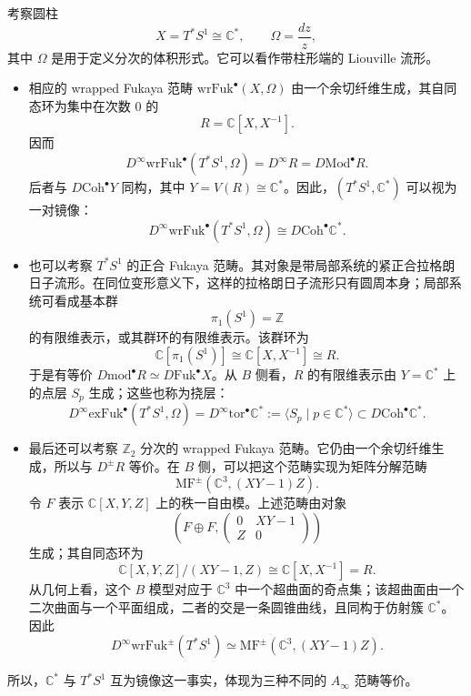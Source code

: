 \begin{example}[圆柱与复环面的镜像]
考察圆柱
\[
  X=T^*S^1\cong\mathbb C^*,
  \qquad \Omega=\frac{dz}{z},
\]
其中 $\Omega$ 是用于定义分次的体积形式。它可以看作带柱形端的 Liouville 流形。
\begin{itemize}
  \item 相应的 wrapped Fukaya 范畴 $\mathrm{wrFuk}^{\bullet}(X,\Omega)$ 由一个余切纤维生成，其自同态环为集中在次数 $0$ 的
  \[
    R=\mathbb C[X,X^{-1}].
  \]
  因而
  \[
    D^{\infty}\mathrm{wrFuk}^{\bullet}(T^*S^1,\Omega)
    =D^{\infty}R=D\mathrm{Mod}^{\bullet}R.
  \]
  后者与 $D\mathrm{Coh}^{\bullet}Y$ 同构，其中 $Y=V(R)\cong\mathbb C^*$。因此，$(T^*S^1,\mathbb C^*)$ 可以视为一对镜像：
  \[
    D^{\infty}\mathrm{wrFuk}^{\bullet}(T^*S^1,\Omega)
    \cong D\mathrm{Coh}^{\bullet}\mathbb C^*.
  \]
  \item 也可以考察 $T^*S^1$ 的正合 Fukaya 范畴。其对象是带局部系统的紧正合拉格朗日子流形。在同位变形意义下，这样的拉格朗日子流形只有圆周本身；局部系统可看成基本群
  \[
    \pi_1(S^1)=\mathbb Z
  \]
  的有限维表示，或其群环的有限维表示。该群环为
  \[
    \mathbb C[\pi_1(S^1)]\cong\mathbb C[X,X^{-1}]\cong R.
  \]
  于是有等价 $D\mathrm{mod}^{\bullet}R\simeq D\mathrm{Fuk}^{\bullet}X$。从 $B$ 侧看，$R$ 的有限维表示由 $Y=\mathbb C^*$ 上的点层 $S_p$ 生成；这些也称为挠层：
  \[
    D^{\infty}\mathrm{exFuk}^{\bullet}(T^*S^1,\Omega)
    =D^{\infty}\mathrm{tor}^{\bullet}\mathbb C^*
    :=\langle S_p\mid p\in\mathbb C^*\rangle
    \subset D\mathrm{Coh}^{\bullet}\mathbb C^*.
  \]
  \item 最后还可以考察 $\mathbb Z_2$ 分次的 wrapped Fukaya 范畴。它仍由一个余切纤维生成，所以与 $D^{\pm}R$ 等价。在 $B$ 侧，可以把这个范畴实现为矩阵分解范畴
  \[
    \mathrm{MF}^{\pm}(\mathbb C^3,(XY-1)Z).
  \]
  令 $F$ 表示 $\mathbb C[X,Y,Z]$ 上的秩一自由模。上述范畴由对象
  \[
    (F\oplus F,\begin{pmatrix}0&XY-1\\Z&0\end{pmatrix})
  \]
  生成；其自同态环为
  \[
    \mathbb C[X,Y,Z]/(XY-1,Z)\cong\mathbb C[X,X^{-1}]=R.
  \]
  从几何上看，这个 $B$ 模型对应于 $\mathbb C^3$ 中一个超曲面的奇点集；该超曲面由一个二次曲面与一个平面组成，二者的交是一条圆锥曲线，且同构于仿射簇 $\mathbb C^*$。因此
  \[
    D^{\infty}\mathrm{wrFuk}^{\pm}(T^*S^1)
    \simeq\mathrm{MF}^{\pm}(\mathbb C^3,(XY-1)Z).
  \]
\end{itemize}
所以，$\mathbb C^*$ 与 $T^*S^1$ 互为镜像这一事实，体现为三种不同的 $A_\infty$ 范畴等价。
\end{example}

